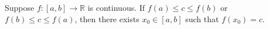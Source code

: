 Suppose $f: [a, b] \to \mathbb{R}$ is continuous. If $f(a) \leq c \leq f(b)$ or $f(b) \leq c \leq f(a)$, then there exists $x_0 \in [a, b]$ such that $f(x_0) = c$.
